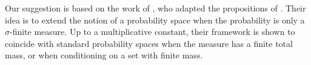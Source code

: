 




Our suggestion is based on the work of \citet{taraldsen_conditional_2016}, who adapted the propositions of \citet{renyi_foundations_1970}. Their idea is to extend the notion of a probability space when the probability is only a $\sigma$-finite measure. Up to a multiplicative constant, their framework is shown to coincide with standard probability spaces when the measure has a finite total mass, or when conditioning on a set with finite mass.


